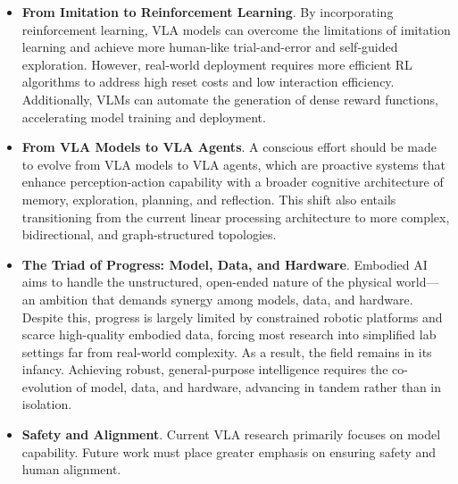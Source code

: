 \documentclass[10pt, a4paper, logo, copyright]{googledeepmind} %
\begin{document}
\begin{itemize}
    \vspace{5pt}
    \item \textbf{From Imitation to Reinforcement Learning}. By incorporating reinforcement learning, VLA models can overcome the limitations of imitation learning and achieve more human-like trial-and-error and self-guided exploration. However, real-world deployment requires more efficient RL algorithms to address high reset costs and low interaction efficiency. Additionally, VLMs can automate the generation of dense reward functions, accelerating model training and deployment.
    \vspace{5pt}
    \item \textbf{From VLA Models to VLA Agents}. A conscious effort should be made to evolve from VLA models to VLA agents, which are proactive systems that enhance perception-action capability with a broader cognitive architecture of memory, exploration, planning, and reflection. This shift also entails transitioning from the current linear processing architecture to more complex, bidirectional, and graph-structured topologies.
    \vspace{5pt}
    \item \textbf{The Triad of Progress: Model, Data, and Hardware}. Embodied AI aims to handle the unstructured, open-ended nature of the physical world—an ambition that demands synergy among models, data, and hardware. Despite this, progress is largely limited by constrained robotic platforms and scarce high-quality embodied data, forcing most research into simplified lab settings far from real-world complexity. As a result, the field remains in its infancy. Achieving robust, general-purpose intelligence requires the co-evolution of model, data, and hardware, advancing in tandem rather than in isolation.
    \vspace{5pt}
    \item \textbf{Safety and Alignment}. Current VLA research primarily focuses on model capability. Future work must place greater emphasis on ensuring safety and human alignment.
\end{itemize}
\end{document}

